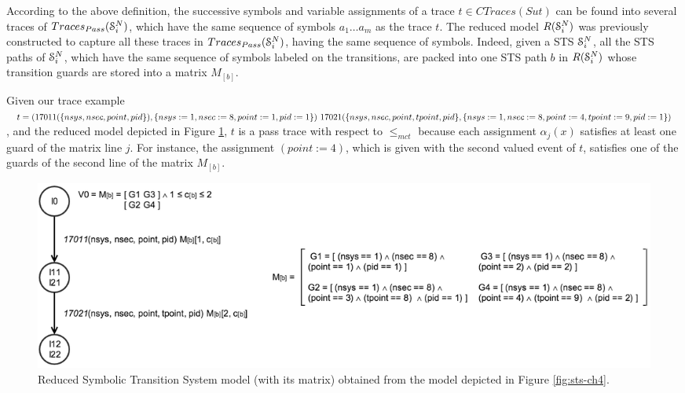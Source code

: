 According to the above definition, the successive symbols and
variable assignments of a trace $t \in CTraces({Sut})$ can be
found into several traces of $Traces_{Pass}(\EuScript{S}_i^{N})$,
which have the same sequence of symbols $a_1 \dots a_m$ as the
trace $t$. The reduced model $R(\EuScript{S}_i^{N})$ was
previously constructed to capture all these traces in
$Traces_{Pass}(\EuScript{S}_i^{N})$, having the same sequence of
symbols. Indeed, given a STS $\EuScript{S}_i^{N}$, all the STS
paths of $\EuScript{S}_i^{N}$, which have the same sequence of
symbols labeled on the transitions, are packed into one STS path
$b$ in $R(\EuScript{S}_i^{N})$ whose transition guards are stored
into a matrix $M_{[b]}$.

\begin{example}
    Given our trace example $t = (17011(\{ nsys, nsec, point, pid
    \}), \{ nsys\\:=1, nsec:=8, point:=1, pid:=1 \})\text{ }
    17021(\{ nsys, nsec, point, tpoint, pid \}, \{ nsys\\:=1,
    nsec:=8, point:=4, tpoint:=9, pid:=1 \})$, and the reduced
    model depicted in Figure \ref{fig:sts-reduced-ch4}, $t$ is a
    pass trace with respect to $\leq_{mct}$ because each
    assignment $\alpha_j(x)$ satisfies at least one guard of the
    matrix line $j$. For instance, the assignment $(point := 4)$,
    which is given with the second valued event of $t$,
    satisfies one of the guards of the second line of the matrix
    $M_{[b]}$.

    \begin{figure}[h]
        \begin{center}
            \includegraphics[width=1.0\linewidth]{figures/reduced_sts_ch4.png}
        \end{center}

        \caption{Reduced Symbolic Transition System model (with
        its matrix) obtained from the model depicted in Figure
        \ref{fig:sts-ch4}.}
        \label{fig:sts-reduced-ch4}
    \end{figure}
\end{example}

